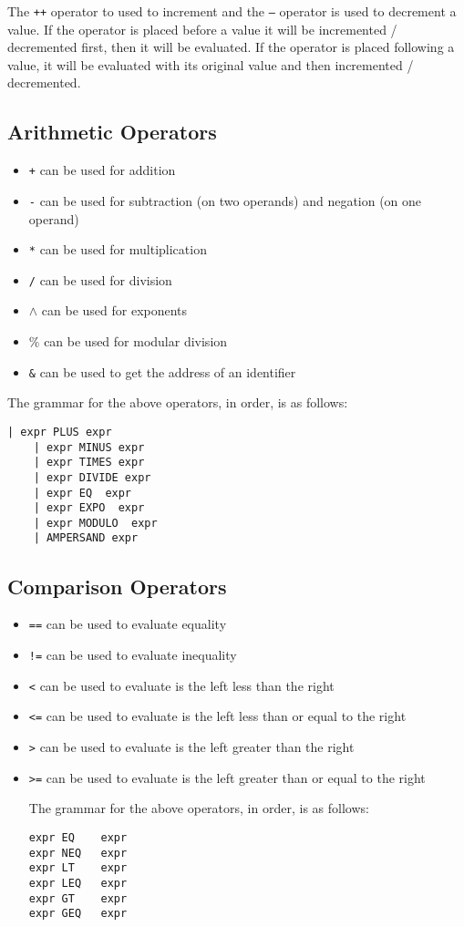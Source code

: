 \documentclass{article}
\begin{document}
 The \texttt{++} operator to used to increment and the \texttt{--} operator is used to decrement a value.  If the operator is placed before a value it will be incremented / decremented first, then it will be evaluated.  If the operator is placed following a value, it will be evaluated with its original value and then incremented / decremented.

\subsection{Arithmetic Operators}
\begin{itemize}
\item \texttt{+} can be used for addition
\item \texttt{-} can be used for subtraction (on two operands) and negation (on one operand)
\item \texttt{*} can be used for multiplication
\item \texttt{/} can be used for division
\item \texttt{$\wedge$} can be used for exponents
\item \texttt{$\%$} can be used for modular division
\item \texttt{\&} can be used to get the address of an identifier
\end{itemize}



The grammar for the above operators, in order, is as follows:
\begin{Verbatim}[frame=single]
	| expr PLUS expr 	
	| expr MINUS expr 	
	| expr TIMES expr 
	| expr DIVIDE expr 
	| expr EQ  expr 
	| expr EXPO  expr 
	| expr MODULO  expr 
	| AMPERSAND expr
\end{Verbatim}


\subsection{Comparison Operators}
\begin{itemize}
\item \texttt{==} can be used to evaluate equality
\item \texttt{!=} can be used to evaluate inequality
\item \texttt{<} can be used to evaluate is the left less than the right
\item \texttt{<=} can be used to evaluate is the left less than or equal to the right
\item \texttt{>} can be used to evaluate is the left greater than the right
\item \texttt{>=} can be used to evaluate is the left greater than or equal to the right

The grammar for the above operators, in order, is as follows:
\begin{Verbatim}[frame=single]
expr EQ    expr
expr NEQ   expr
expr LT    expr
expr LEQ   expr
expr GT    expr
expr GEQ   expr
\end{Verbatim}
\end{itemize}
\end{document}

